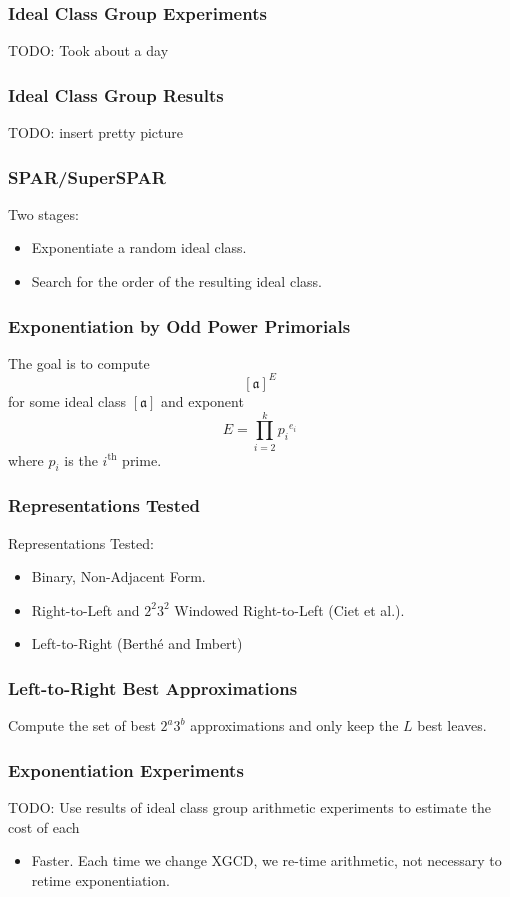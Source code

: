 \documentclass{beamer}
\newcommand{\ideal}{\mathfrak}
\newcommand{\idealclass}[1]{\left[ \ideal #1 \right]}
\newcommand{\aclass}{\idealclass a}
\newcommand{\ith}{i^{\textrm{th}}}
\begin{document}
\begin{frame}
\frametitle{Ideal Class Group Experiments}
TODO: Took about a day
\end{frame}

\begin{frame}
\frametitle{Ideal Class Group Results}
TODO: insert pretty picture
\end{frame}

\begin{frame}
\frametitle{SPAR/SuperSPAR}
Two stages:
\begin{itemize}
\item Exponentiate a random ideal class.
\item Search for the order of the resulting ideal class.
\end{itemize}
\end{frame}

\begin{frame}
\frametitle{Exponentiation by Odd Power Primorials}
The goal is to compute
\[
\aclass ^ E
\]
for some ideal class $\aclass$ and exponent
\[
	E = \prod_{i=2}^k {p_i}^{e_i}
\]
where $p_i$ is the $\ith$ prime.
\end{frame}

\begin{frame}
\frametitle{Representations Tested}
Representations Tested:
\begin{itemize}
\item Binary, Non-Adjacent Form.
\item Right-to-Left and $2^2 3^2$ Windowed Right-to-Left (Ciet et al.).
\item Left-to-Right (Berth{\'e} and Imbert)
\end{itemize}
\end{frame}

\begin{frame}
\frametitle{Left-to-Right Best Approximations}
Compute the set of best $2^a3^b$ approximations and only keep the $L$ best leaves.
\end{frame}

\begin{frame}
\frametitle{Exponentiation Experiments}
TODO: Use results of ideal class group arithmetic experiments to estimate the cost of each
\begin{itemize}
\item Faster.  Each time we change XGCD, we re-time arithmetic, not necessary to retime exponentiation.
\end{itemize}
\end{frame}
\end{document}
